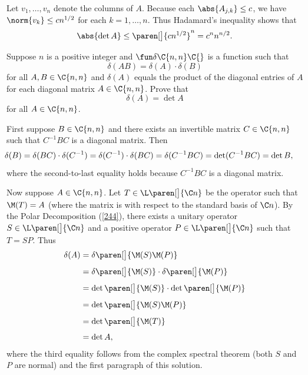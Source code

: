 \begin{Solution}
Let $v_1, \ldots, v_n$ denote the columns of $A$. Because each $\abs{A_{j,k}} \le c$, we have $\norm{v_k} \le c n^{1/2}$ for
each $k=1, \ldots, n$. Thus Hadamard's inequality shows that
\[
\abs{ \det A } \le \paren[\big]{c n^{1/2}}^n = c^n n^{n/2}.
\]
\end{Solution}

\exercise
Suppose $n$ is a positive integer and $\fun \delta {\C{n,n}} {\C{}}$ is a function such that
\[
\delta(AB) = \delta(A) \cdot \delta(B)
\]
for all $A, B \in \C{n,n}$ and $\delta(A)$ equals the product of the diagonal entries of $A$ for each diagonal matrix $A \in \C{n,n}$. Prove that
\[
\delta(A) = \det A
\]
for all $A \in \C{n,n}$.

\begin{Solution}
First suppose $B \in \C{n,n}$ and there exists an invertible matrix $C \in \C{n,n}$ such that $C^{-1} B C$ is a diagonal matrix. Then
\[ \hspace*{-.2in}
\delta(B) = \delta(BC) \cdot \delta(C^{-1}) = \delta(C^{-1}) \cdot \delta(BC) = \delta( C^{-1} B C) = \det( C^{-1} B C) = \det B,
\]
where the second-to-last equality holds because  $C^{-1} B C$ is a diagonal matrix.

Now suppose $A \in \C{n,n}$. Let $T \in \L\paren[\big]{\C n}$ be the operator such that $\M(T) = A$ (where the matrix is with respect to the standard basis of $\C n$). By the Polar Decomposition (\ref{244}), there exists a unitary operator $S \in \L\paren[\big]{\C n}$ and a positive operator $P \in \L\paren[\big]{\C n}$ such that $T = SP$. Thus
\begin{align*}
\delta(A) &= \delta\paren[\big]{ \M(S) \M(P) } \\[4bp]
&=  \delta\paren[\big]{ \M(S) } \cdot  \delta\paren[\big]{ \M(P) }\\[4bp]
&=  \det\paren[\big]{ \M(S) } \cdot  \det\paren[\big]{ \M(P) } \\[4bp]
&= \det\paren[\big]{ \M(S) \M(P) } \\[4bp]
&= \det \paren[\big]{ \M(T) } \\[4bp]
&= \det A,
\end{align*}
where the third equality follows from the complex spectral theorem (both $S$ and $P$ are normal) and the first paragraph of this solution.
\end{Solution}

